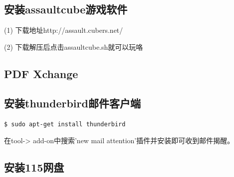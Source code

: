 \subsection{安装assaultcube游戏软件}
(1) 下载地址http://assault.cubers.net/

(2) 下载解压后点击assaultcube.sh就可以玩咯

\subsection{PDF Xchange}

\subsection{安装thunderbird邮件客户端}
\verb"$ sudo apt-get install thunderbird"

在tool-> add-on中搜索’new mail attention’插件并安装即可收到邮件揭醒。

\subsection{安装115网盘}
